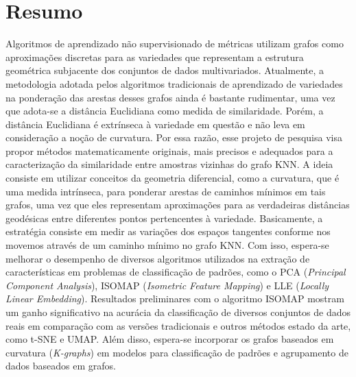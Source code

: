\documentclass[a4paper,12pt]{article}
\begin{document}


\newpage

\newpage
\section*{Resumo}
\label{sc:resumo}
\noindent
Algoritmos de aprendizado não supervisionado de métricas utilizam grafos como aproximações discretas para as variedades que representam a estrutura geométrica subjacente dos conjuntos de dados multivariados. Atualmente, a metodologia adotada pelos algoritmos tradicionais de aprendizado de variedades na ponderação das arestas desses grafos ainda é bastante rudimentar, uma vez que adota-se a distância Euclidiana como medida de similaridade. Porém, a distância Euclidiana é extrínseca à variedade em questão e não leva em consideração a noção de curvatura. Por essa razão, esse projeto de pesquisa visa propor métodos matematicamente originais, mais precisos e adequados para a caracterização da similaridade entre amostras vizinhas do grafo KNN. A ideia consiste em utilizar conceitos da geometria diferencial, como a curvatura, que é uma medida intrínseca, para ponderar arestas de caminhos mínimos em tais grafos, uma vez que eles representam aproximações para as verdadeiras distâncias geodésicas entre diferentes pontos pertencentes à variedade. Basicamente, a estratégia consiste em medir as variações dos espaços tangentes conforme nos movemos através de um caminho mínimo no grafo KNN. Com isso, espera-se melhorar o desempenho de diversos algoritmos utilizados na extração de características em problemas de classificação de padrões, como o PCA (\emph{Principal Component Analysis}), ISOMAP (\emph{Isometric Feature Mapping}) e LLE (\emph{Locally Linear Embedding}). Resultados preliminares com o algoritmo ISOMAP mostram um ganho significativo na acurácia da classificação de diversos conjuntos de dados reais em comparação com as versões tradicionais e outros métodos estado da arte, como t-SNE e UMAP. Além disso, espera-se incorporar os grafos baseados em curvatura (\emph{K-graphs}) em modelos para classificação de padrões e agrupamento de dados baseados em grafos.  
\end{document}
